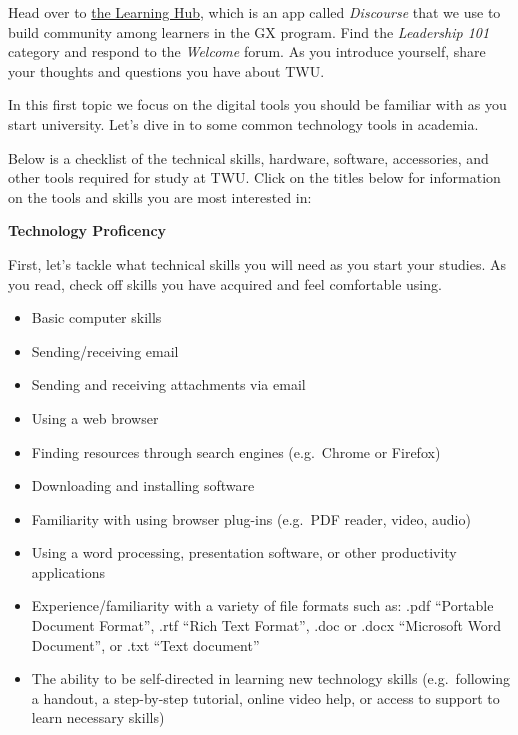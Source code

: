 \documentclass[
]{book}
\providecommand{\tightlist}{%
  \setlength{\itemsep}{0pt}\setlength{\parskip}{0pt}}
\theoremstyle{definition}
\theoremstyle{definition}
\theoremstyle{definition}
\theoremstyle{definition}
\theoremstyle{remark}
\begin{document}
\begin{reflect}
Head over to \href{https://twu.discourse.group}{the Learning Hub}, which is an app called \emph{Discourse} that we use to build community among learners in the GX program. Find the \emph{Leadership 101} category and respond to the \emph{Welcome} forum. As you introduce yourself, share your thoughts and questions you have about TWU.
\end{reflect}

In this first topic we focus on the digital tools you should be familiar with as you start university. Let's dive in to some common technology tools in academia.

Below is a checklist of the technical skills, hardware, software, accessories, and other tools required for study at TWU. Click on the titles below for information on the tools and skills you are most interested in:

\textbf{Technology Proficency}

First, let's tackle what technical skills you will need as you start your studies. As you read, check off skills you have acquired and feel comfortable using.

\begin{itemize}
\tightlist
\item
  Basic computer skills\\
\item
  Sending/receiving email\\
\item
  Sending and receiving attachments via email\\
\item
  Using a web browser\\
\item
  Finding resources through search engines (e.g.~Chrome or Firefox)\\
\item
  Downloading and installing software\\
\item
  Familiarity with using browser plug-ins (e.g.~PDF reader, video, audio)\\
\item
  Using a word processing, presentation software, or other productivity applications\\
\item
  Experience/familiarity with a variety of file formats such as: .pdf ``Portable Document Format'', .rtf ``Rich Text Format'', .doc or .docx ``Microsoft Word Document'', or .txt ``Text document''\\
\item
  The ability to be self-directed in learning new technology skills (e.g.~following a handout, a step-by-step tutorial, online video help, or access to support to learn necessary skills)
\end{itemize}
\end{document}
